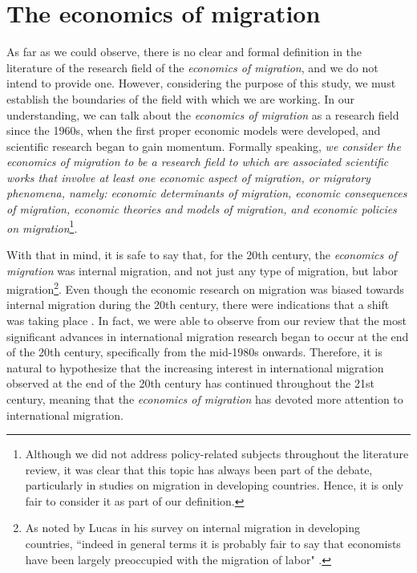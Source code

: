 \section{The economics of migration} \label{eco_migration}

As far as we could observe, there is no clear and formal definition in the literature of the research field of the \textit{economics of migration}, and we do not intend to provide one. However, considering the purpose of this study, we must establish the boundaries of the field with which we are working. In our understanding, we can talk about the \textit{economics of migration} as a research field since the 1960s, when the first proper economic models were developed, and scientific research began to gain momentum. Formally speaking, \textit{we consider the economics of migration to be a research field to which are associated scientific works that involve at least one economic aspect of migration, or migratory phenomena, namely: economic determinants of migration, economic consequences of migration, economic theories and models of migration, and economic policies on migration}\footnote{Although we did not address policy-related subjects throughout the literature review, it was clear that this topic has always been part of the debate, particularly in studies on migration in developing countries. Hence, it is only fair to consider it as part of our definition.}. 

With that in mind, it is safe to say that, for the 20th century, the \textit{economics of migration} was internal migration, and not just any type of migration, but labor migration\footnote{As noted by Lucas in his survey on internal migration in developing countries, ``indeed in general terms it is probably fair to say that economists have been largely preoccupied with the migration of labor" \citep[p. 786]{lucas_internal_1997}.}. Even though the economic research on migration was biased towards internal migration during the 20th century, there were indications that a shift was taking place \citep{cushing_crossing_2004}. In fact, we were able to observe from our review that the most significant advances in international migration research began to occur at the end of the 20th century, specifically from the mid-1980s onwards. Therefore, it is natural to hypothesize that the increasing interest in international migration observed at the end of the 20th century has continued throughout the 21st century, meaning that the \textit{economics of migration} has devoted more attention to international migration.  